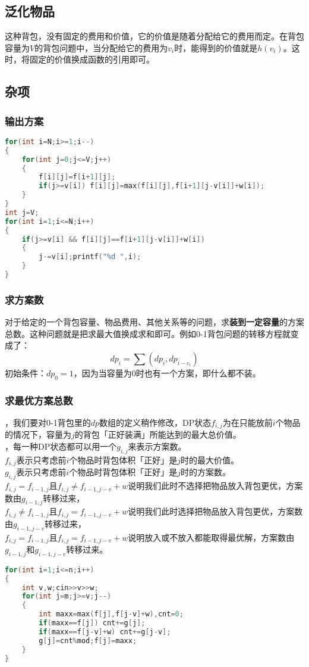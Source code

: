 \documentclass[a4paper]{book}
\begin{document}
\subsection*{泛化物品}
这种背包，没有固定的费用和价值，它的价值是随着分配给它的费用而定。在背包容量为$V$的背包问题中，当分配给它的费用为$v_i$时，能得到的价值就是$h(v_i)$。这时，将固定的价值换成函数的引用即可。
\subsection*{杂项}
\subsubsection{输出方案}
\begin{lstlisting}[language=c++]
for(int i=N;i>=1;i--)
{
    for(int j=0;j<=V;j++)
    {
        f[i][j]=f[i+1][j];
        if(j>=v[i]) f[i][j]=max(f[i][j],f[i+1][j-v[i]]+w[i]);
    }
}
int j=V;
for(int i=1;i<=N;i++)
{
    if(j>=v[i] && f[i][j]==f[i+1][j-v[i]]+w[i])
    {
        j-=v[i];printf("%d ",i);
    }
}
\end{lstlisting}
\subsubsection{求方案数}
对于给定的一个背包容量、物品费用、其他关系等的问题，求\textbf{装到一定容量}的方案总数。这种问题就是把求最大值换成求和即可。例如0-1背包问题的转移方程就变成了：
$$
\mathit{dp}_i=\sum(dp_i,dp_{i-c_i})
$$
初始条件：$\mathit{dp}_0=1$，因为当容量为$0$时也有一个方案，即什么都不装。
\subsubsection{求最优方案总数}
，我们要对0-1背包里的$dp$数组的定义稍作修改，DP状态$f_{i,j}$为在只能放前$i$个物品的情况下，容量为$j$的背包「正好装满」所能达到的最大总价值。\\
，每一种DP状态都可以用一个$g_{i,j}$来表示方案数。\\
\indent$f_{i,j}$表示只考虑前$i$个物品时背包体积「正好」是$j$时的最大价值。\\
\indent$g_{i,j}$表示只考虑前$i$个物品时背包体积「正好」是$j$时的方案数。\\
$f_{i,j}=f_{i-1,j}$且$f_{i,j}\neq f_{i-1,j-v}+w$说明我们此时不选择把物品放入背包更优，方案数由$g_{i-1,j}$转移过来，\\
$f_{i,j}\neq f_{i-1,j}$且$f_{i,j}=f_{i-1,j-v}+w$说明我们此时选择把物品放入背包更优，方案数由$g_{i-1,j-v}$转移过来，\\
$f_{i,j}=f_{i-1,j}$且$f_{i,j}=f_{i-1,j-v}+w$说明放入或不放入都能取得最优解，方案数由$g_{i-1,j}$和$g_{i-1,j-v}$转移过来。
\begin{lstlisting}[language=c++]
for(int i=1;i<=n;i++)
{
    int v,w;cin>>v>>w;
    for(int j=m;j>=v;j--)
    {
        int maxx=max(f[j],f[j-v]+w),cnt=0;
        if(maxx==f[j]) cnt+=g[j];
        if(maxx==f[j-v]+w) cnt+=g[j-v];
        g[j]=cnt%mod;f[j]=maxx;
    }
}
\end{lstlisting}
\end{document}
